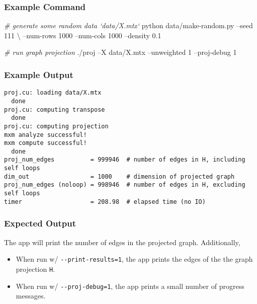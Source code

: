 \documentclass[10pt,oneside]{memoir}
\newenvironment{Shaded}{}{}
\newcommand{\CommentTok}[1]{\textcolor[rgb]{0.38,0.63,0.69}{\textit{#1}}}
\newcommand{\ExtensionTok}[1]{#1}
\newcommand{\NormalTok}[1]{#1}
\providecommand{\tightlist}{%
  \setlength{\itemsep}{0pt}\setlength{\parskip}{0pt}}
\begin{document}
\hypertarget{example-command-5}{%
\subsubsection{Example Command}\label{example-command-5}}

\begin{Shaded}
\begin{Highlighting}[]
\CommentTok{# generate some random data `data/X.mtx`}
\ExtensionTok{python}\NormalTok{ data/make-random.py --seed 111 \textbackslash{}}
\NormalTok{        --num-rows 1000 --num-cols 1000 --density 0.1}

\CommentTok{# run graph projection}
\ExtensionTok{./proj}\NormalTok{ --X data/X.mtx --unweighted 1 --proj-debug 1}
\end{Highlighting}
\end{Shaded}

\hypertarget{example-output-4}{%
\subsubsection{Example Output}\label{example-output-4}}

\begin{verbatim}
proj.cu: loading data/X.mtx
  done
proj.cu: computing transpose
  done
proj.cu: computing projection
mxm analyze successful!
mxm compute successful!
  done
proj_num_edges          = 999946  # number of edges in H, including self loops
dim_out                 = 1000    # dimension of projected graph
proj_num_edges (noloop) = 998946  # number of edges in H, excluding self loops
timer                   = 208.98  # elapsed time (no IO)
\end{verbatim}

\hypertarget{expected-output-4}{%
\subsubsection{Expected Output}\label{expected-output-4}}

The app will print the number of edges in the projected graph.
Additionally,

\begin{itemize}
\tightlist
\item
  When run w/ \texttt{-\/-print-results=1}, the app prints the edges of
  the the graph projection \texttt{H}.
\item
  When run w/ \texttt{-\/-proj-debug=1}, the app prints a small number
  of progress messages.
\end{itemize}
\end{document}
